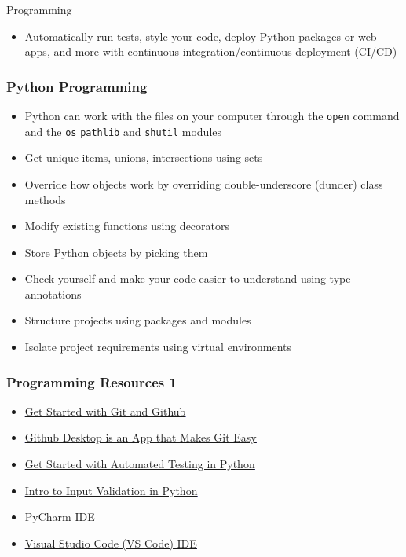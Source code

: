 \documentclass[handout, 11pt]{beamer}
\begin{document}
\begin{section}{Programming}
\begin{frame}
\begin{itemize}
\vfill
\item Automatically run tests, style your code, deploy Python packages or web apps, and more with continuous integration/continuous deployment (CI/CD)
\end{itemize}
\end{frame}
\begin{frame}
\frametitle{Python Programming}
\begin{itemize}
\item Python can work with the files on your computer through the
\texttt{open}
command and the
\texttt{os}
\texttt{pathlib}
and
\texttt{shutil}
modules
\vfill
\item Get unique items, unions, intersections using sets
\vfill
\item Override how objects work by overriding double-underscore (dunder) class methods
\vfill
\item Modify existing functions using decorators
\vfill
\item Store Python objects by picking them
\vfill
\item Check yourself and make your code easier to understand using type annotations
\vfill
\item Structure projects using packages and modules
\vfill
\item Isolate project requirements using virtual environments
\end{itemize}
\end{frame}
\begin{frame}
\frametitle{Programming Resources 1}
\begin{itemize}
\small
\vfill
\item \textcolor{blue}{\underline{\href{https://product.hubspot.com/blog/git-and-github-tutorial-for-beginners}{Get Started with Git and Github}}}
\vfill
\item \textcolor{blue}{\underline{\href{https://desktop.github.com/}{Github Desktop is an App that Makes Git Easy}}}
\vfill
\item \textcolor{blue}{\underline{\href{https://realpython.com/python-testing/}{Get Started with Automated Testing in Python}}}
\vfill
\item \textcolor{blue}{\underline{\href{https://www.youtube.com/watch?v=IL3eZYiV70g}{Intro to Input Validation in Python}}}
\vfill
\item \textcolor{blue}{\underline{\href{https://www.jetbrains.com/pycharm/}{PyCharm IDE}}}
\vfill
\item \textcolor{blue}{\underline{\href{https://code.visualstudio.com/}{Visual Studio Code (VS Code) IDE}}}

\end{itemize}
\end{frame}
\end{section}
\end{document}
